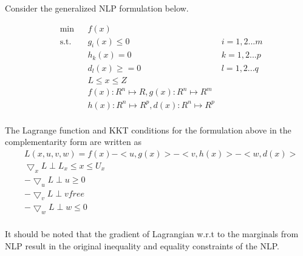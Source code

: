 \documentclass{article}
\begin{document}
\noindent Consider the generalized NLP formulation below.

\begin{equation}
\begin{aligned}
&	\min
& & f(x) \\
& \text{s.t.} & & 	 g_{i}(x) \leqslant 0	&	i = 1,2...m \\
& & &			h_{k}(x) = 0	 &	k = 1,2...p \\
& & &			d_{l}(x) \geqslant =0		&	l = 1,2...q \\
& & &			L \leq x \leq Z \\
& & &			f(x): {\!R}^n \mapsto \!R , g(x): {\!R}^n \mapsto {\!R}^m\\
& & &			h(x): {\!R}^n \mapsto {\!R}^ p , d(x): {\!R}^n \mapsto {\!R}^ p\\
\end{aligned}
\end{equation}

\noindent The Lagrange function and KKT conditions for the formulation above in the complementarity form are written as \\

\begin{equation}
\begin{aligned}
& L(x,u,v,w) = f(x) - <u,g(x)> - <v,h(x)> - <w,d(x)>  \\
& \bigtriangledown_x L  \perp L_x \leq x \leq U_x 	\\
& - \bigtriangledown_u L  \perp u \geq 0	\\
& -\bigtriangledown_v L  \perp v free	\\
& -\bigtriangledown_w L  \perp w \leq 0	\\
\end{aligned}
\end{equation}

\noindent It should be noted that the gradient of Lagrangian w.r.t to the marginals from NLP result in the original inequality and equality constraints of the NLP.
\end{document}
